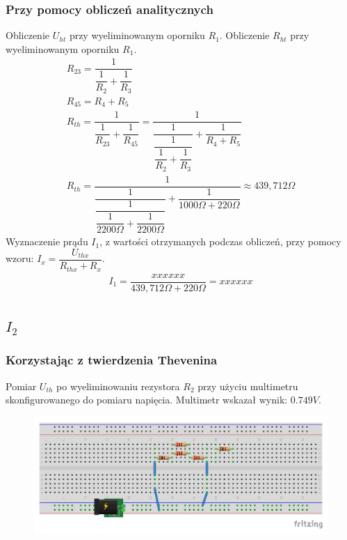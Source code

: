 \documentclass[polish,polish,a4paper]{article}
\begin{document}
\begin{spacing}{2}
	\subsubsection{Przy pomocy obliczeń analitycznych}
	Obliczenie $U_{ht}$ przy wyeliminowanym oporniku $ R_{1} $.
	Obliczenie $R_{ht}$ przy wyeliminowanym oporniku $ R_{1} $.
	\begin{gather*}
		R_{23} = \dfrac{1}{\dfrac{1}{R_{2}} + \dfrac{1}{R_{3}}}\\
		R_{45} = R_{4} + R_{5}\\
		R_{th} = \dfrac{1}{\dfrac{1}{R_{23}} + \dfrac{1}{R_{45}}} = \dfrac{1}{\dfrac{1}{\dfrac{1}{\dfrac{1}{R_{2}} + \dfrac{1}{R_{3}}}} + \dfrac{1}{R_{4} + R_{5}}}\\
			R_{th} = \dfrac{1}{\dfrac{1}{\dfrac{1}{\dfrac{1}{2200\Omega} + \dfrac{1}{2200\Omega}}} + \dfrac{1}{1000\Omega + 220\Omega}} \approx 439,712\Omega
	\end{gather*}
	Wyznaczenie prądu $I_{1}$, z wartości otrzymanych podczas obliczeń, przy pomocy wzoru: $I_{x}= \dfrac{U_{thx}}{R_{thx} + R_{x}}$.
	\begin{gather*}
	I_{1}=\dfrac{xxxxxx}{439,712\Omega + 220\Omega } = xxxxxx
	\end{gather*}
	\subsection{$I_{2}$}
		\subsubsection{Korzystając z twierdzenia Thevenina}
			Pomiar $U_{th}$ po wyeliminowaniu rezystora $R_{2}$ przy  użyciu multimetru skonfigurowanego do pomiaru napięcia. Multimetr wskazał wynik: $0.749V$.
		\begin{figure}[H]
			\centering
			\includegraphics[scale=0.8]{R2_pomiar_napiecia_bb.pdf}
		\end{figure}
		

\end{spacing}
\end{document}
